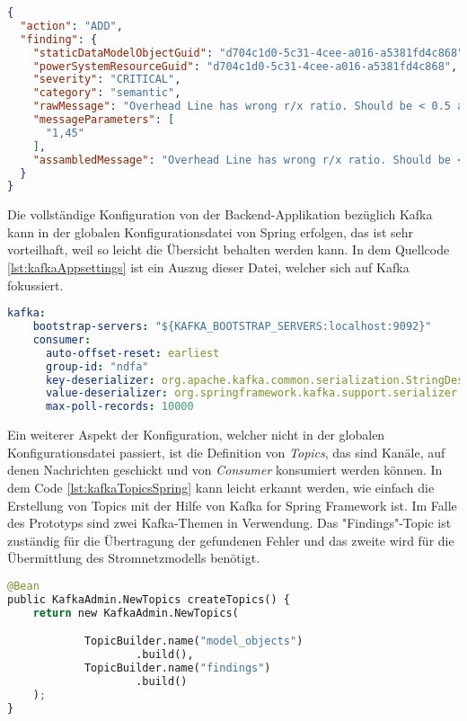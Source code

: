 \begin{lstlisting}[language={json},caption={Die Fehlerinformationen über einen gefundenen Fehler im Netz},captionpos=b,label={lst:kafkaFindingJson}]
{
  "action": "ADD",
  "finding": {
    "staticDataModelObjectGuid": "d704c1d0-5c31-4cee-a016-a5381fd4c868",
    "powerSystemResourceGuid": "d704c1d0-5c31-4cee-a016-a5381fd4c868",
    "severity": "CRITICAL",
    "category": "semantic",
    "rawMessage": "Overhead Line has wrong r/x ratio. Should be < 0.5 and is %s",
    "messageParameters": [
      "1,45"
    ],
    "assambledMessage": "Overhead Line has wrong r/x ratio. Should be < 0.5 and is 1,45"
  }
}
\end{lstlisting}


Die vollständige Konfiguration von der Backend-Applikation bezüglich Kafka kann in der globalen Konfigurationsdatei von Spring erfolgen, das ist sehr vorteilhaft, weil so leicht die Übersicht behalten werden kann. In dem Quellcode \ref{lst:kafkaAppsettings} ist ein Auszug dieser Datei, welcher sich auf Kafka fokussiert. 

\begin{lstlisting}[language={yaml},caption={Auszug aus der Konfigurationsdatei für Spring },captionpos=b,label={lst:kafkaAppsettings}]
  kafka:
    bootstrap-servers: "${KAFKA_BOOTSTRAP_SERVERS:localhost:9092}"
    consumer:
      auto-offset-reset: earliest
      group-id: "ndfa"
      key-deserializer: org.apache.kafka.common.serialization.StringDeserializer
      value-deserializer: org.springframework.kafka.support.serializer.JsonDeserializer
      max-poll-records: 10000
\end{lstlisting}

Ein weiterer Aspekt der Konfiguration, welcher nicht in der globalen Konfigurationsdatei passiert, ist die Definition von \emph{Topics}, das sind Kanäle, auf denen Nachrichten geschickt und von \emph{Consumer} konsumiert werden können. In dem Code \ref{lst:kafkaTopicsSpring} kann leicht erkannt werden, wie einfach die Erstellung von Topics mit der Hilfe von Kafka for Spring Framework ist. Im Falle des Prototyps sind zwei Kafka-Themen in Verwendung. Das "Findings"-Topic ist zuständig für die Übertragung der gefundenen Fehler und das zweite wird für die Übermittlung des Stromnetzmodells benötigt.

\begin{lstlisting}[language={python},caption={Definiton eines Topics mithilfe von Kafka for Spring Framework },captionpos=b,label={lst:kafkaTopicsSpring}]
@Bean
public KafkaAdmin.NewTopics createTopics() {
    return new KafkaAdmin.NewTopics(

            TopicBuilder.name("model_objects")
                    .build(),
            TopicBuilder.name("findings")
                    .build()
    );
}
\end{lstlisting}

